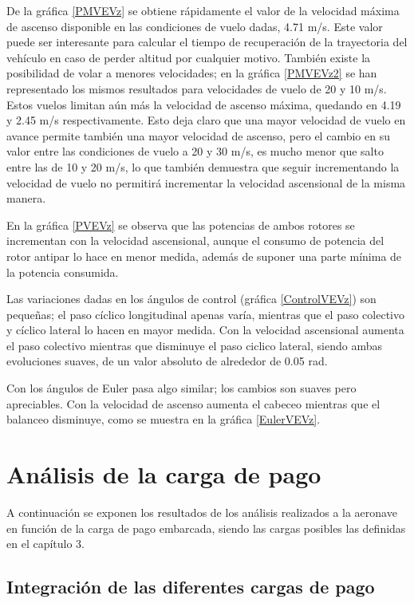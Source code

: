 De la gráfica \ref{PMVEVz} se obtiene rápidamente el valor de la velocidad máxima de ascenso disponible en las condiciones de vuelo dadas, 4.71 m/s. Este valor puede ser interesante para calcular el tiempo de recuperación de la trayectoria del vehículo en caso de perder altitud por cualquier motivo.
También existe la posibilidad de volar a menores velocidades; en la gráfica \ref{PMVEVz2} se han representado los mismos resultados para velocidades de vuelo de 20 y 10 m/s. Estos vuelos limitan aún más la velocidad de ascenso máxima, quedando en 4.19 y 2.45 m/s respectivamente. Esto deja claro que una mayor velocidad de vuelo en avance permite también una mayor velocidad de ascenso, pero el cambio en su valor entre las condiciones de vuelo a 20 y 30 m/s, es mucho menor que salto entre las de 10 y 20 m/s, lo que también demuestra que seguir incrementando la velocidad de vuelo no permitirá incrementar la velocidad ascensional de la misma manera.

En la gráfica \ref{PVEVz} se observa que las potencias de ambos rotores se incrementan con la velocidad ascensional, aunque el consumo de potencia del rotor antipar lo hace en menor medida, además de suponer una parte mínima de la potencia consumida.

Las variaciones dadas en los ángulos de control (gráfica \ref{ControlVEVz}) son pequeñas; el paso cíclico longitudinal apenas varía, mientras que el paso colectivo y cíclico lateral lo hacen en mayor medida. Con la velocidad ascensional aumenta el paso colectivo mientras que disminuye el paso ciclico lateral, siendo ambas evoluciones suaves, de un valor absoluto de alrededor de 0.05 rad.

Con los ángulos de Euler pasa algo similar; los cambios son suaves pero apreciables. Con la velocidad de ascenso aumenta el cabeceo mientras que el balanceo disminuye, como se muestra en la gráfica \ref{EulerVEVz}.

\section{Análisis de la carga de pago}

A continuación se exponen los resultados de los análisis realizados a la aeronave en función de la carga de pago embarcada, siendo las cargas posibles las definidas en el capítulo 3.

\subsection*{Integración de las diferentes cargas de pago}

